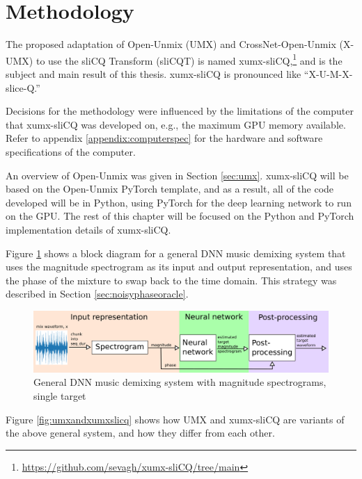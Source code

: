 \documentclass[report.tex]{subfiles}
\begin{document}
\section{Methodology}
\label{sec:methodology}

The proposed adaptation of Open-Unmix (UMX) and CrossNet-Open-Unmix (X-UMX) to use the sliCQ Transform (sliCQT) is named xumx-sliCQ,\footnote{\url{https://github.com/sevagh/xumx-sliCQ/tree/main}} and is the subject and main result of this thesis. xumx-sliCQ is pronounced like ``X-U-M-X-slice-Q.''

Decisions for the methodology were influenced by the limitations of the computer that xumx-sliCQ was developed on, e.g., the maximum GPU memory available. Refer to appendix \ref{appendix:computerspec} for the hardware and software specifications of the computer.

An overview of Open-Unmix was given in Section \ref{sec:umx}. xumx-sliCQ will be based on the Open-Unmix PyTorch template, and as a result, all of the code developed will be in Python, using PyTorch for the deep learning network to run on the GPU. The rest of this chapter will be focused on the Python and PyTorch implementation details of xumx-sliCQ.

Figure \ref{fig:generalmdx} shows a block diagram for a general DNN music demixing system that uses the magnitude spectrogram as  its input and output representation, and uses the phase of the mixture to swap back to the time domain. This strategy was described in Section \ref{sec:noisyphaseoracle}.

\begin{figure}[ht]
	\centering
	\includegraphics[width=\textwidth]{./images-blockdiagrams/generic_mdx.png}
	\caption{General DNN music demixing system with magnitude spectrograms, single target}
	\label{fig:generalmdx}
\end{figure}

Figure \ref{fig:umxandxumxslicq} shows how UMX and xumx-sliCQ are variants of the above general system, and how they differ from each other.
\end{document}
